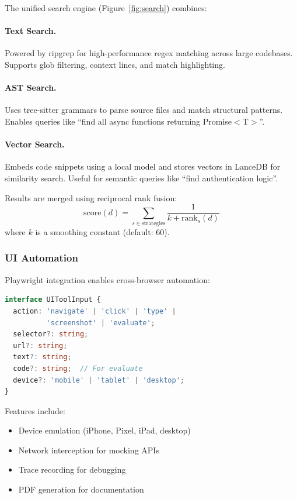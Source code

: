 \documentclass[11pt,twocolumn]{article}
\begin{document}
The unified search engine (Figure~\ref{fig:search}) combines:

\paragraph{Text Search.} Powered by ripgrep for high-performance regex matching across large codebases. Supports glob filtering, context lines, and match highlighting.

\paragraph{AST Search.} Uses tree-sitter grammars to parse source files and match structural patterns. Enables queries like ``find all async functions returning Promise$<$T$>$''.

\paragraph{Vector Search.} Embeds code snippets using a local model and stores vectors in LanceDB for similarity search. Useful for semantic queries like ``find authentication logic''.

Results are merged using reciprocal rank fusion:
\begin{equation}
    \text{score}(d) = \sum_{s \in \text{strategies}} \frac{1}{k + \text{rank}_s(d)}
\end{equation}
where $k$ is a smoothing constant (default: 60).

\subsubsection{UI Automation}

Playwright integration enables cross-browser automation:

\begin{lstlisting}[language=TypeScript]
interface UIToolInput {
  action: 'navigate' | 'click' | 'type' |
          'screenshot' | 'evaluate';
  selector?: string;
  url?: string;
  text?: string;
  code?: string;  // For evaluate
  device?: 'mobile' | 'tablet' | 'desktop';
}
\end{lstlisting}

Features include:
\begin{itemize}
    \item Device emulation (iPhone, Pixel, iPad, desktop)
    \item Network interception for mocking APIs
    \item Trace recording for debugging
    \item PDF generation for documentation
\end{itemize}
\end{document}
